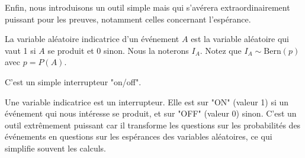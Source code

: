 Enfin, nous introduisons un outil simple mais qui s'avérera extraordinairement puissant pour les preuves, notamment celles concernant l'espérance.

\begin{definitionbox}
La variable aléatoire indicatrice d'un événement $A$ est la variable aléatoire qui vaut 1 si $A$ se produit et 0 sinon. Nous la noterons $I_A$. Notez que $I_A \sim \text{Bern}(p)$ avec $p=P(A)$.
\end{definitionbox}

C'est un simple interrupteur "on/off".

\begin{intuitionbox}
Une variable indicatrice est un interrupteur. Elle est sur "ON" (valeur 1) si un événement qui nous intéresse se produit, et sur "OFF" (valeur 0) sinon. C'est un outil extrêmement puissant car il transforme les questions sur les probabilités des événements en questions sur les espérances des variables aléatoires, ce qui simplifie souvent les calculs.
\end{intuitionbox}